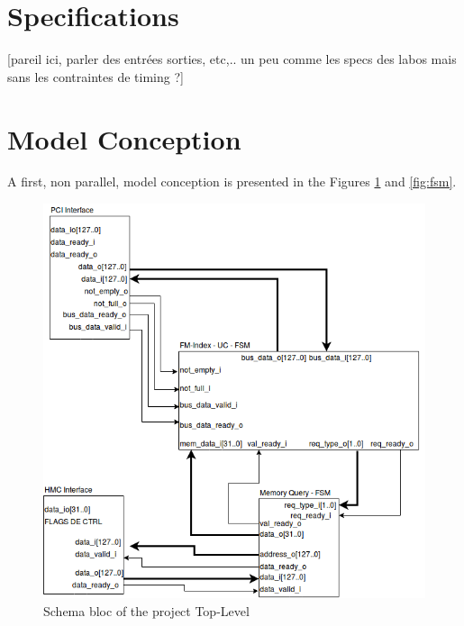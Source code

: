 \section{Specifications}

[pareil ici, parler des entrées sorties, etc,.. un peu comme les specs des labos mais sans les contraintes de timing ?]

\section{Model Conception}

A first, non parallel, model conception is presented in the Figures \ref{fig:seqschema} and \ref{fig:fsm}.\\
\begin{figure}[H]
    \centering
    \includegraphics[scale = 0.5]{Figures/schema_bloc.png}
    \caption{Schema bloc of the project Top-Level}
    \label{fig:seqschema}
\end{figure}

